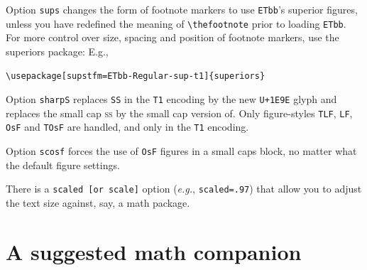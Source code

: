 \documentclass[11pt]{article}
\begin{document}


Option {\tt sups} changes the form of footnote markers to use {\tt ETbb}'s superior figures, unless you have redefined the meaning of \verb|\thefootnote| prior to loading {\tt ETbb}. For more control over size, spacing and position of footnote markers, use the \textsf{superiors} package: E.g.,
\begin{verbatim}
\usepackage[supstfm=ETbb-Regular-sup-t1]{superiors}
\end{verbatim}

Option {\tt sharpS} replaces {\tt SS} in the {\tt T1} encoding by the new {\tt U+1E9E} glyph and replaces the small cap \textsc{ss} by the small cap version of\hspace{.5em}{\tt U+1E9E}. Only figure-styles {\tt TLF}, {\tt LF}, {\tt OsF} and {\tt TOsF} are handled, and only in the {\tt T1} encoding.

Option {\tt scosf} forces the use of {\tt OsF} figures in a small caps block, no matter what the default figure settings.

There is a {\tt scaled [or scale]} option (\emph{e.g.}, {\tt scaled=.97}) that allow you to adjust the text size against, say, a math package. 


\section*{A suggested math companion}
\end{document}
